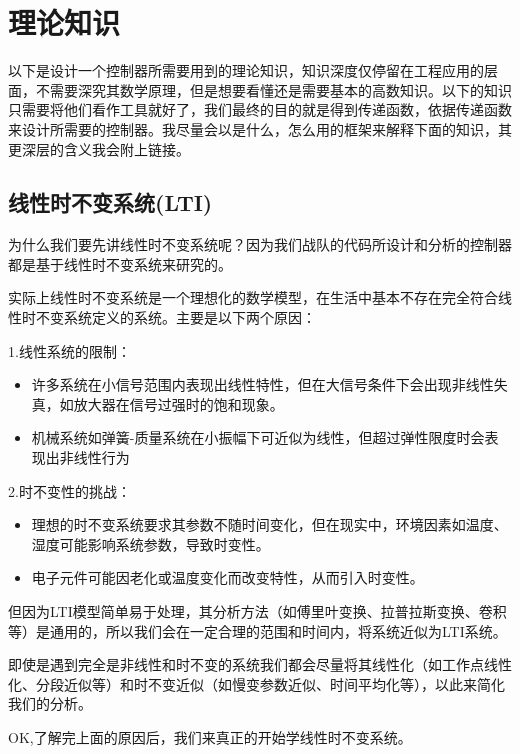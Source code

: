 \documentclass[UTF8,a4paper,12pt]{ctexart}
\begin{document}
  \section{理论知识}

  \begin{flushleft}
    以下是设计一个控制器所需要用到的理论知识，知识深度仅停留在工程应用的层面，不需要深究其数学原理，但是想要看懂还是需要基本的高数知识。以下的知识只需要将他们看作工具就好了，我们最终的目的就是得到传递函数，依据传递函数来设计所需要的控制器。我尽量会以是什么，怎么用的框架来解释下面的知识，其更深层的含义我会附上链接。
  \end{flushleft}

  \subsection{线性时不变系统(LTI)}
    \begin{flushleft}
      为什么我们要先讲线性时不变系统呢？因为我们战队的代码所设计和分析的控制器都是基于线性时不变系统来研究的。
      \par 实际上线性时不变系统是一个理想化的数学模型，在生活中基本不存在完全符合线性时不变系统定义的系统。主要是以下两个原因：
      \begin{notitlebox}
          \par1.线性系统的限制：
          \begin{itemize} 
            \item 许多系统在小信号范围内表现出线性特性，但在大信号条件下会出现非线性失真，如放大器在信号过强时的饱和现象。
            \item 机械系统如弹簧-质量系统在小振幅下可近似为线性，但超过弹性限度时会表现出非线性行为
          \end{itemize}

          \par2.时不变性的挑战：
          \begin{itemize} 
          \item 理想的时不变系统要求其参数不随时间变化，但在现实中，环境因素如温度、湿度可能影响系统参数，导致时变性。
          \item 电子元件可能因老化或温度变化而改变特性，从而引入时变性。  
          \end{itemize}
          \begin{flushleft}
           但因为LTI模型简单易于处理，其分析方法（如傅里叶变换、拉普拉斯变换、卷积等）是通用的，所以我们会在一定合理的范围和时间内，将系统近似为LTI系统。\par 即使是遇到完全是非线性和时不变的系统我们都会尽量将其线性化（如工作点线性化、分段近似等）和时不变近似（如慢变参数近似、时间平均化等），以此来简化我们的分析。
          \end{flushleft}
      \end{notitlebox}
    \end{flushleft}
    \begin{flushleft}
      OK,了解完上面的原因后，我们来真正的开始学线性时不变系统。
    \end{flushleft}
\end{document}
